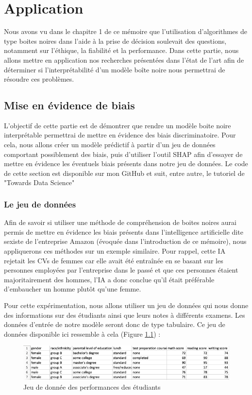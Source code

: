 \chapter{Application}
Nous avons vu dans le chapitre 1 de ce mémoire que l'utilisation d'algorithmes de type boites noires dans l'aide à la prise de décision soulevait des questions, notamment sur l'éthique, la fiabilité et la performance. Dans cette partie, nous allons mettre en application nos recherches présentées dans l'état de l'art afin de déterminer si l'interprétabilité d'un modèle boîte noire nous permettrai de résoudre ces problèmes.
\section{Mise en évidence de biais}
L'objectif de cette partie est de démontrer que rendre un modèle boite noire interprétable permettrai de mettre en évidence des biais discriminatoire. Pour cela, nous allons créer un modèle prédictif à partir d'un jeu de données comportant possiblement des biais, puis d'utiliser l'outil SHAP afin d'essayer de mettre en évidence les éventuels biais présents dans notre jeu de données. Le code de cette section est disponible sur mon GitHub \cite{shapMyDepot} et suit, entre autre, le tutoriel de "Towards Data Science"\cite{shapTuto}
\subsection{Le jeu de données}
Afin de savoir si utiliser une méthode de compréhension de boites noires aurai permis de mettre en évidence les biais présents dans l'intelligence artificielle dite sexiste de l'entreprise Amazon (évoquée dans l'introduction de ce mémoire), nous appliquerons ces méthodes sur un exemple similaire. Pour rappel, cette IA rejetait les CVs de femmes car elle avait été entraînée en se basant sur les personnes employées par l'entreprise dans le passé et que ces personnes étaient majoritairement des hommes, l'IA a donc conclue qu'il était préférable d'embaucher un homme plutôt qu'une femme.\par
Pour cette expérimentation, nous allons utiliser un jeu de données qui nous donne des informations sur des étudiants ainsi que leurs notes à différents examens. Les données d'entrée de notre modèle seront donc de type tabulaire. Ce jeu de données disponible ici \cite{examScore} ressemble à cela (Figure \ref{studentsPerformanceDataSet}) :

\begin{figure}[h]
    \includegraphics[scale=0.65]{src_img/studentsPerformanceDataSet.png}
    \caption{Jeu de donnée des performances des étudiants}
    \label{studentsPerformanceDataSet}
\end{figure}


